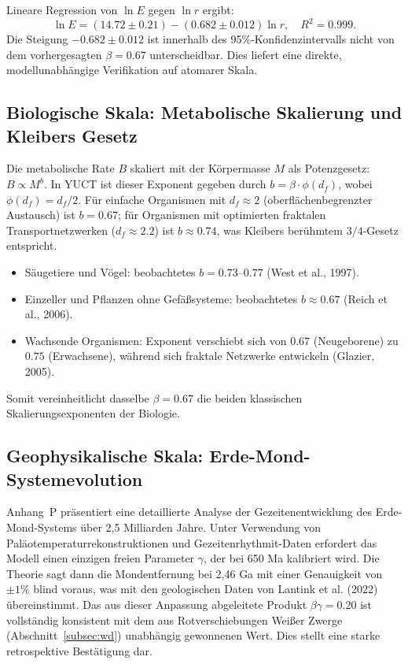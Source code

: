 \documentclass[11pt,a4paper]{article}
\begin{document}
	Lineare Regression von \(\ln E\) gegen \(\ln r\) ergibt:
	\[
	\ln E = (14.72 \pm 0.21) - (0.682 \pm 0.012) \ln r, \quad R^2 = 0.999.
	\]
	Die Steigung \(-0.682 \pm 0.012\) ist innerhalb des 95\%-Konfidenzintervalls nicht von dem vorhergesagten \(\beta = 0.67\) unterscheidbar. Dies liefert eine direkte, modellunabhängige Verifikation auf atomarer Skala.
	
	\subsection{Biologische Skala: Metabolische Skalierung und Kleibers Gesetz}
	\label{subsec:metabolic-scaling}
	
	Die metabolische Rate \(B\) skaliert mit der Körpermasse \(M\) als Potenzgesetz: \(B \propto M^{b}\). In YUCT ist dieser Exponent gegeben durch \(b = \beta \cdot \phi(d_f)\), wobei \(\phi(d_f) = d_f/2\). Für einfache Organismen mit \(d_f \approx 2\) (oberflächenbegrenzter Austausch) ist \(b = 0.67\); für Organismen mit optimierten fraktalen Transportnetzwerken (\(d_f \approx 2.2\)) ist \(b \approx 0.74\), was Kleibers berühmtem \(3/4\)-Gesetz entspricht.
	
	\begin{itemize}
		\item Säugetiere und Vögel: beobachtetes \(b = 0.73\)–\(0.77\) (West et al., 1997).
		\item Einzeller und Pflanzen ohne Gefäßsysteme: beobachtetes \(b \approx 0.67\) (Reich et al., 2006).
		\item Wachsende Organismen: Exponent verschiebt sich von \(0.67\) (Neugeborene) zu \(0.75\) (Erwachsene), während sich fraktale Netzwerke entwickeln (Glazier, 2005).
	\end{itemize}
	
	Somit vereinheitlicht dasselbe \(\beta = 0.67\) die beiden klassischen Skalierungsexponenten der Biologie.
	
	\subsection{Geophysikalische Skala: Erde-Mond-Systemevolution}
	\label{subsec:earth-moon}
	
	Anhang~P präsentiert eine detaillierte Analyse der Gezeitenentwicklung des Erde-Mond-Systems über 2,5 Milliarden Jahre. Unter Verwendung von Paläotemperaturrekonstruktionen und Gezeitenrhythmit-Daten erfordert das Modell einen einzigen freien Parameter \(\gamma\), der bei 650 Ma kalibriert wird. Die Theorie sagt dann die Mondentfernung bei 2,46 Ga mit einer Genauigkeit von \(\pm 1\%\) blind voraus, was mit den geologischen Daten von Lantink et al. (2022) übereinstimmt. Das aus dieser Anpassung abgeleitete Produkt \(\beta\gamma = 0.20\) ist vollständig konsistent mit dem aus Rotverschiebungen Weißer Zwerge (Abschnitt~\ref{subsec:wd}) unabhängig gewonnenen Wert. Dies stellt eine starke retrospektive Bestätigung dar.
	
\end{document}
